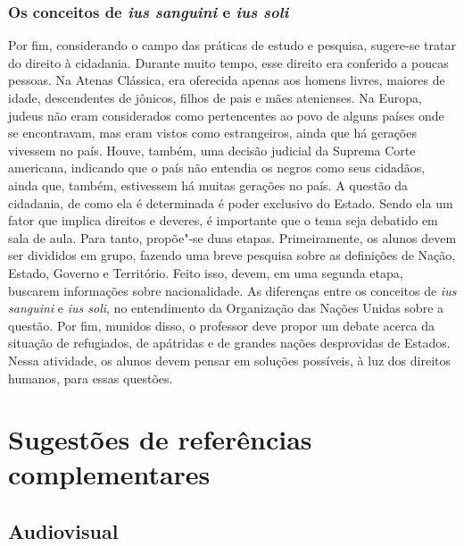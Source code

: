 \documentclass[12pt]{extarticle}
\begin{document}
\subsubsection{Os conceitos de \emph{ius sanguini} e \emph{ius soli}}

Por fim, considerando o campo das práticas de estudo e pesquisa,
sugere-se tratar do direito à cidadania.
Durante muito tempo, esse direito era conferido a poucas
pessoas. Na Atenas Clássica, era oferecida apenas aos homens livres,
maiores de idade, descendentes de jônicos, filhos de pais e mães
atenienses. Na Europa, judeus não eram considerados como pertencentes
ao povo de alguns países onde se encontravam, mas eram vistos como
estrangeiros, ainda que há gerações vivessem no país. Houve, também,
uma decisão judicial da Suprema Corte americana, indicando que o país
não entendia os negros como seus cidadãos, ainda que, também,
estivessem há muitas gerações no país. A questão da cidadania, de como
ela é determinada é poder exclusivo do Estado. Sendo ela um fator que
implica direitos e deveres, é importante que o tema seja debatido em
sala de aula. Para tanto, propõe"-se duas etapas. Primeiramente, os
alunos devem ser divididos em grupo, fazendo uma breve pesquisa sobre
as definições de Nação, Estado, Governo e Território. Feito isso,
devem, em uma segunda etapa, buscarem informações sobre nacionalidade.
As diferenças entre os conceitos de \emph{ius sanguini} e \emph{ius
soli}, no entendimento da Organização das Nações Unidas sobre a
questão. Por fim, munidos disso, o professor deve propor um debate
acerca da situação de refugiados, de apátridas e de grandes nações
desprovidas de Estados. Nessa atividade, os alunos devem pensar em
soluções possíveis, à luz dos direitos humanos, para essas questões.

\section{Sugestões de referências complementares}\label{sugestoes}

\subsection{Audiovisual}
\end{document}
